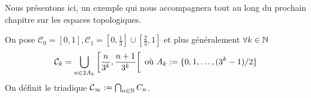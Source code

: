 Nous présentons ici, un exemple qui nous accompagnera tout au long du prochain chapitre sur les espaces topologiques.

\begin{definition}
    On pose $\mathcal C_0=[0,1], \mathcal C_1=\left[0,\frac 1 3\right]\cup\left[\frac 2 3,1 \right]$ et plus généralement $\forall k \in\mathbb{N}$
    \begin{equation*}
        \mathcal C_k = \bigcup_{n\in 2A_k}\left[ \dfrac{n}{3^k},\dfrac{n+1}{3^k}\right[\text{ où } A_k:=\{0,1,\ldots,(3^k-1)/2\}
    \end{equation*}
    On définit le triadique $\mathcal C_{\infty}:=\bigcap_{n\in\mathbb{N}}C_n$. 
\end{definition}

\centering
